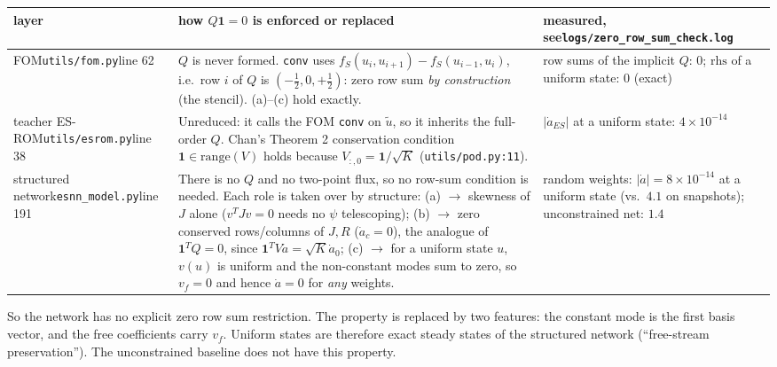 \documentclass[11pt,a4paper]{article}
\newcommand{\code}[1]{\texttt{\small #1}}
\begin{document}
\begin{center}\small
\begin{tabular}{p{2.5cm}p{7.6cm}p{4.9cm}}
\toprule
layer & how $Q\mathbf 1=0$ is enforced or replaced & measured, see\newline\code{logs/zero\_row\_sum\_check.log}\\\midrule
FOM\newline\code{utils/fom.py}\newline line 62 & $Q$ is never formed. \code{conv} uses $f_S(u_i,u_{i+1})-f_S(u_{i-1},u_i)$, i.e.\ row $i$ of $Q$ is $(-\tfrac12,0,+\tfrac12)$: zero row sum \emph{by construction} (the stencil). (a)--(c) hold exactly. & row sums of the implicit $Q$: $0$; $\mathrm{rhs}$ of a uniform state: $0$ (exact)\\
teacher ES-ROM\newline\code{utils/esrom.py}\newline line 38 & Unreduced: it calls the FOM \code{conv} on $\tilde u$, so it inherits the full-order $Q$. Chan's Theorem 2 conservation condition $\mathbf 1\in\mathrm{range}(V)$ holds because $V_{:,0}=\mathbf 1/\sqrt K$ (\code{utils/pod.py:11}). & $|\dot a_{ES}|$ at a uniform state: $4\times10^{-14}$\\
structured network\newline\code{esnn\_model.py}\newline line 191 & There is no $Q$ and no two-point flux, so no row-sum condition is needed. Each role is taken over by structure: (a) $\to$ skewness of $J$ alone ($v^TJv=0$ needs no $\psi$ telescoping); (b) $\to$ zero conserved rows/columns of $J,R$ ($\dot a_c=0$), the analogue of $\mathbf 1^TQ=0$, since $\mathbf 1^TV\dot a=\sqrt K\dot a_0$; (c) $\to$ for a uniform state $u$, $v(u)$ is uniform and the non-constant modes sum to zero, so $v_f=0$ and hence $\dot a=0$ for \emph{any} weights. & random weights: $|\dot a|=8\times10^{-14}$ at a uniform state (vs.\ $4.1$ on snapshots); unconstrained net: $1.4$\\
\bottomrule
\end{tabular}
\end{center}
So the network has no explicit zero row sum restriction. The property is replaced by two features: the constant mode is the first basis vector, and the free coefficients carry $v_f$. Uniform states are therefore exact steady states of the structured network (``free-stream preservation''). The unconstrained baseline does not have this property.
\end{document}
